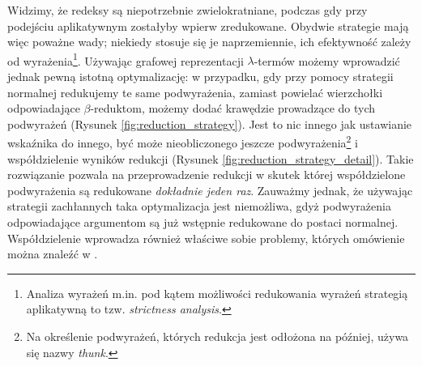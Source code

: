 Widzimy, że redeksy są niepotrzebnie zwielokratniane, podczas gdy przy podejściu aplikatywnym zostałyby wpierw zredukowane. Obydwie strategie mają więc poważne wady; niekiedy stosuje się je naprzemiennie, ich efektywność zależy od wyrażenia\footnote{Analiza wyrażeń m.in. pod kątem możliwości redukowania wyrażeń strategią aplikatywną to tzw. \emph{strictness analysis}.}. Używając grafowej reprezentacji \(\lambda\)-termów możemy wprowadzić jednak pewną istotną optymalizację: w przypadku, gdy przy pomocy strategii normalnej redukujemy te same podwyrażenia, zamiast powielać wierzchołki odpowiadające \(\beta\)-reduktom, możemy dodać krawędzie prowadzące do tych podwyrażeń (Rysunek \ref{fig:reduction_strategy}). Jest to nic innego jak ustawianie wskaźnika do innego, być może nieobliczonego jeszcze podwyrażenia\footnote{Na określenie podwyrażeń, których redukcja jest odłożona na później, używa się nazwy \emph{thunk}.} i współdzielenie wyników redukcji (Rysunek \ref{fig:reduction_strategy_detail}). Takie rozwiązanie pozwala na przeprowadzenie redukcji w skutek której współdzielone podwyrażenia są redukowane \emph{dokładnie jeden raz}. Zauważmy jednak, że używając strategii zachłannych taka optymalizacja jest niemożliwa, gdyż podwyrażenia odpowiadające argumentom są już wstępnie redukowane do postaci normalnej. Współdzielenie wprowadza również właściwe sobie problemy, których omówienie można znaleźć w \cite[Rozdział 3.8.3]{parallel_graph_rewriting}.

